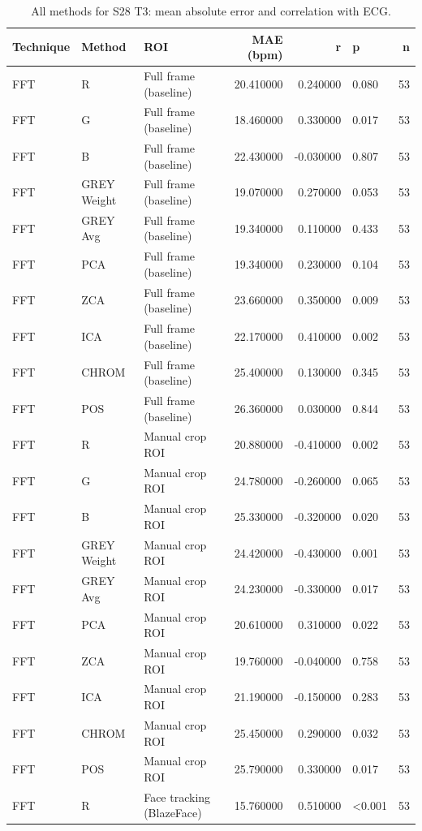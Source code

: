 \begin{table}[htbp]
\centering
\caption{All methods for S28 T3: mean absolute error and correlation with ECG.}
\label{tab:spread_s28_t3}
\begin{tabular}{l l l r r l r}
\toprule
Technique & Method & ROI & MAE (bpm) & r & p & n \\
\midrule
FFT & R & Full frame (baseline) & 20.410000 & 0.240000 & 0.080 & 53 \\
FFT & G & Full frame (baseline) & 18.460000 & 0.330000 & 0.017 & 53 \\
FFT & B & Full frame (baseline) & 22.430000 & -0.030000 & 0.807 & 53 \\
FFT & GREY Weight & Full frame (baseline) & 19.070000 & 0.270000 & 0.053 & 53 \\
FFT & GREY Avg & Full frame (baseline) & 19.340000 & 0.110000 & 0.433 & 53 \\
FFT & PCA & Full frame (baseline) & 19.340000 & 0.230000 & 0.104 & 53 \\
FFT & ZCA & Full frame (baseline) & 23.660000 & 0.350000 & 0.009 & 53 \\
FFT & ICA & Full frame (baseline) & 22.170000 & 0.410000 & 0.002 & 53 \\
FFT & CHROM & Full frame (baseline) & 25.400000 & 0.130000 & 0.345 & 53 \\
FFT & POS & Full frame (baseline) & 26.360000 & 0.030000 & 0.844 & 53 \\
FFT & R & Manual crop ROI & 20.880000 & -0.410000 & 0.002 & 53 \\
FFT & G & Manual crop ROI & 24.780000 & -0.260000 & 0.065 & 53 \\
FFT & B & Manual crop ROI & 25.330000 & -0.320000 & 0.020 & 53 \\
FFT & GREY Weight & Manual crop ROI & 24.420000 & -0.430000 & 0.001 & 53 \\
FFT & GREY Avg & Manual crop ROI & 24.230000 & -0.330000 & 0.017 & 53 \\
FFT & PCA & Manual crop ROI & 20.610000 & 0.310000 & 0.022 & 53 \\
FFT & ZCA & Manual crop ROI & 19.760000 & -0.040000 & 0.758 & 53 \\
FFT & ICA & Manual crop ROI & 21.190000 & -0.150000 & 0.283 & 53 \\
FFT & CHROM & Manual crop ROI & 25.450000 & 0.290000 & 0.032 & 53 \\
FFT & POS & Manual crop ROI & 25.790000 & 0.330000 & 0.017 & 53 \\
FFT & R & Face tracking (BlazeFace) & 15.760000 & 0.510000 & <0.001 & 53 \\

\end{tabular}
\end{table}
